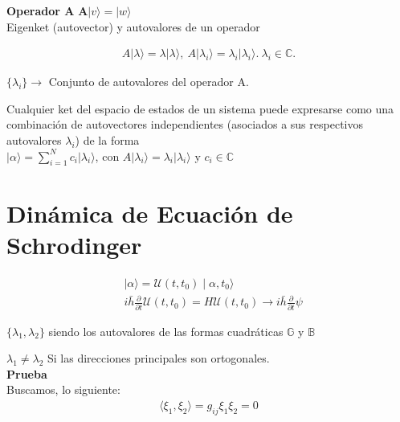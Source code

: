 \documentclass[a4,12pt]{aleph-notas}
\begin{document}
\textbf{Operador A} $\mathbf{A} \vert v \rangle=\vert w \rangle$\\
Eigenket (autovector) y autovalores de un operador 

\begin{align*}
    A \vert \lambda \rangle = \lambda \vert \lambda \rangle, \ A\vert\lambda_i\rangle= \lambda_i\vert\lambda_i\rangle. \ \lambda_i \in \mathbb{C}.
\end{align*}

\begin{center}
    $\{ \lambda_i\} \rightarrow$ Conjunto de autovalores del operador A. 
\end{center}

Cualquier ket del espacio de estados de un sistema puede expresarse como una combinación de autovectores independientes (asociados a sus respectivos autovalores {$\lambda_i$}) de la forma\\

$\vert \alpha \rangle = \sum_{i=1}^{N} c_i \vert \lambda_i \rangle$, con $A \vert\lambda_i\rangle=\lambda_i\vert\lambda_i\rangle$ y $c_i \in \mathbb{C}$




\vspace*{-8mm}
\section{Dinámica de Ecuación de Schrodinger}


\begin{align*}
    &\mid \alpha \rangle = \mathcal{U}(t,t_0) \mid \alpha,t_0 \rangle\\
    &i \bar{h}\frac{\partial}{\partial t} \mathcal{U}(t,t_0) =H\mathcal{U}(t,t_0) \rightarrow i \bar{h} \frac{\partial}{\partial t}\psi
\end{align*}

$\{ \lambda_1, \lambda_2 \}$ siendo los autovalores de las formas cuadráticas $\mathbb{G}$ y $\mathbb{B}$

\begin{lem}$\lambda_1 \neq \lambda_2$ Si las direcciones principales son ortogonales.\\
    \large{\textbf{Prueba}}\\
    Buscamos, lo siguiente:
    \begin{align*}
        \langle \xi_1, \xi_2 \rangle=g_{ij}\xi_1 \xi_2=0
    \end{align*}

\end{lem}
\end{document}
